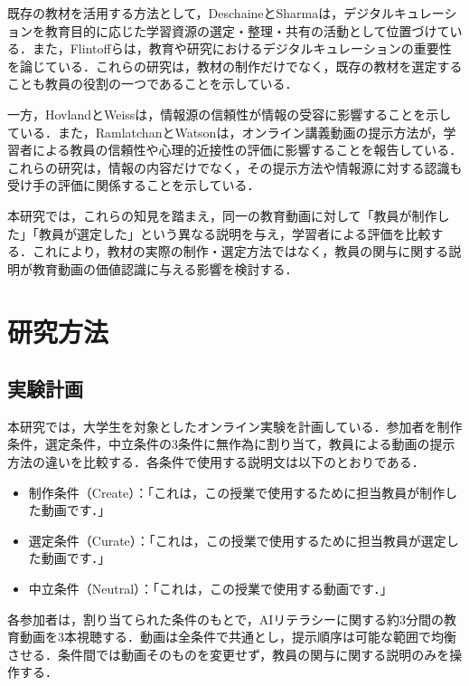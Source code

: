\documentclass[11pt]{ltjarticle}
\begin{document}
既存の教材を活用する方法として，DeschaineとSharma\cite{deschaine2015}は，デジタルキュレーションを教育目的に応じた学習資源の選定・整理・共有の活動として位置づけている．また，Flintoffら\cite{flintoff2014}は，教育や研究におけるデジタルキュレーションの重要性を論じている．これらの研究は，教材の制作だけでなく，既存の教材を選定することも教員の役割の一つであることを示している．

一方，HovlandとWeiss\cite{hovland1951}は，情報源の信頼性が情報の受容に影響することを示している．また，RamlatchanとWatson\cite{ramlatchan2020}は，オンライン講義動画の提示方法が，学習者による教員の信頼性や心理的近接性の評価に影響することを報告している．これらの研究は，情報の内容だけでなく，その提示方法や情報源に対する認識も受け手の評価に関係することを示している．

本研究では，これらの知見を踏まえ，同一の教育動画に対して「教員が制作した」「教員が選定した」という異なる説明を与え，学習者による評価を比較する．これにより，教材の実際の制作・選定方法ではなく，教員の関与に関する説明が教育動画の価値認識に与える影響を検討する．



\section{研究方法}

\subsection{実験計画}

本研究では，大学生を対象としたオンライン実験を計画している．参加者を制作条件，選定条件，中立条件の3条件に無作為に割り当て，教員による動画の提示方法の違いを比較する．各条件で使用する説明文は以下のとおりである．

\begin{itemize}
  \item 制作条件（Create）：「これは，この授業で使用するために担当教員が制作した動画です．」
  \item 選定条件（Curate）：「これは，この授業で使用するために担当教員が選定した動画です．」
  \item 中立条件（Neutral）：「これは，この授業で使用する動画です．」
\end{itemize}

各参加者は，割り当てられた条件のもとで，AIリテラシーに関する約3分間の教育動画を3本視聴する．動画は全条件で共通とし，提示順序は可能な範囲で均衡させる．条件間では動画そのものを変更せず，教員の関与に関する説明のみを操作する．
\end{document}
